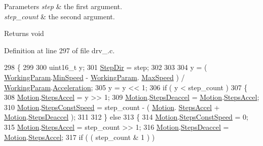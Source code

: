 \begin{DoxyParams}{Parameters}
{\em step} & the first argument. \\
\hline
{\em step\-\_\-count} & the second argument. \\
\hline
\end{DoxyParams}
\begin{DoxyReturn}{Returns}
void 
\end{DoxyReturn}


Definition at line 297 of file drv\-\_.\-c.


\begin{DoxyCode}
298 \{
299 
300     uint16\_t y;
301     \hyperlink{drv__8825_8c_a237abe7878c99e9fb1c077c0b916733f}{StepDir} = step;
302 
303 
304     y = ( \hyperlink{drv__8825_8c_a4c86b1f568d93b1bfc8c30587b2c271a}{WorkingParam}.\hyperlink{structMotor__Parameters_aaf0ac3ed818f5c89cc86ea1d9174dc43}{MinSpeed} - \hyperlink{drv__8825_8c_a4c86b1f568d93b1bfc8c30587b2c271a}{WorkingParam}.
      \hyperlink{structMotor__Parameters_a501458e333945f49f03c295e2f49e3b9}{MaxSpeed} ) / \hyperlink{drv__8825_8c_a4c86b1f568d93b1bfc8c30587b2c271a}{WorkingParam}.\hyperlink{structMotor__Parameters_aa9f1146edc6d945d535eec80a01481f1}{Acceleration};
305     y = y << 1;
306     if ( y < step\_count )
307     \{
308         \hyperlink{structMotion}{Motion}.\hyperlink{structMotion_a970d0810aac5cab75c8dd0c95e4473da}{StepsAccel} = y >> 1;
309         \hyperlink{structMotion}{Motion}.\hyperlink{structMotion_a0d7942de8bba5304852a9f2d8fe833e5}{StepsDeaccel} = \hyperlink{structMotion}{Motion}.\hyperlink{structMotion_a970d0810aac5cab75c8dd0c95e4473da}{StepsAccel};
310         \hyperlink{structMotion}{Motion}.\hyperlink{structMotion_aa99fa8cb04ab25fc08e7b65664b7fdef}{StepsConstSpeed} = step\_count - ( \hyperlink{structMotion}{Motion}.
      \hyperlink{structMotion_a970d0810aac5cab75c8dd0c95e4473da}{StepsAccel} + \hyperlink{structMotion}{Motion}.\hyperlink{structMotion_a0d7942de8bba5304852a9f2d8fe833e5}{StepsDeaccel} );
311 
312     \} \textcolor{keywordflow}{else}
313     \{
314         \hyperlink{structMotion}{Motion}.\hyperlink{structMotion_aa99fa8cb04ab25fc08e7b65664b7fdef}{StepsConstSpeed} = 0;
315         \hyperlink{structMotion}{Motion}.\hyperlink{structMotion_a970d0810aac5cab75c8dd0c95e4473da}{StepsAccel} = step\_count >> 1;
316         \hyperlink{structMotion}{Motion}.\hyperlink{structMotion_a0d7942de8bba5304852a9f2d8fe833e5}{StepsDeaccel} = \hyperlink{structMotion}{Motion}.\hyperlink{structMotion_a970d0810aac5cab75c8dd0c95e4473da}{StepsAccel};
317         \textcolor{keywordflow}{if} ( ( step\_count & 1 ) )

\end{DoxyCode}
